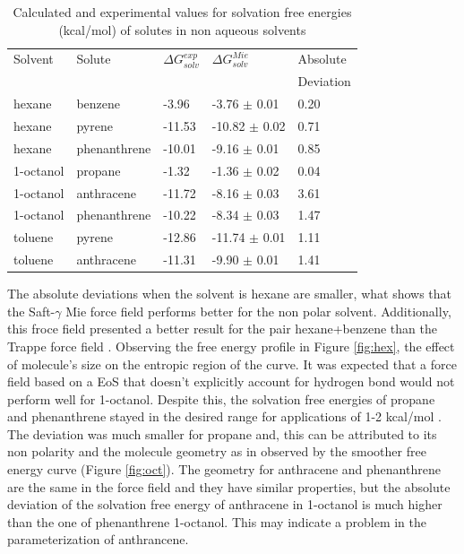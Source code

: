 \begin{table}[h]
\centering
  \caption{Calculated and experimental values for solvation free energies (kcal/mol) of solutes in non aqueous solvents}
  \label{tbl:solv1}
  \begin{tabular}{lllll}
    \hline
      Solvent & Solute & $\Delta G_{solv}^{exp}$ & $\Delta G_{solv}^{Mie}$ & Absolute \\
      & & & &Deviation \\
    \hline
    hexane    & benzene      & -3.96  & -3.76  $\pm$ 0.01 & 0.20 \\
    hexane    & pyrene       & -11.53 & -10.82 $\pm$ 0.02 & 0.71 \\
    hexane    & phenanthrene & -10.01 & -9.16  $\pm$ 0.01 & 0.85 \\
    1-octanol & propane      & -1.32  & -1.36  $\pm$ 0.02 & 0.04 \\
    1-octanol & anthracene   & -11.72 & -8.16  $\pm$ 0.03 & 3.61 \\
    1-octanol & phenanthrene & -10.22 & -8.34  $\pm$ 0.03 & 1.47 \\
    toluene   & pyrene       & -12.86 & -11.74 $\pm$ 0.01 & 1.11\\
    toluene   & anthracene   & -11.31 & -9.90 $\pm$ 0.01 & 1.41\\
    \hline
  \end{tabular}
\end{table}

The absolute deviations when the solvent is hexane are smaller, what shows that the Saft-$\gamma$ Mie force field performs better for the non polar solvent. Additionally, this froce field presented a better result for the pair hexane+benzene than the Trappe force field \cite{garrido2011}. Observing the free energy profile in Figure \ref{fig:hex}, the effect of molecule's size on the entropic region of the curve. It was expected that a force field based on a EoS that doesn't explicitly account for hydrogen bond would not perform well for 1-octanol. Despite this, the solvation free energies of propane and phenanthrene stayed in the desired range for applications of 1-2 kcal/mol \cite{doimobley}. The deviation was much smaller for propane and, this can be attributed to its non polarity and the molecule geometry as in observed by the smoother free energy curve (Figure \ref{fig:oct}). The geometry for anthracene and phenanthrene are the same in the force field and they have similar properties, but the absolute deviation of the solvation free energy of anthracene in 1-octanol is much higher than the one of phenanthrene 1-octanol. This may indicate a problem in the parameterization of anthrancene.     

